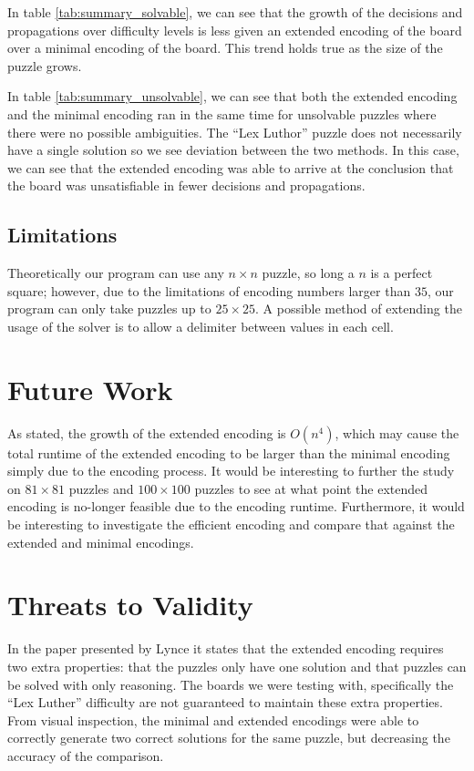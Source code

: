 \documentclass[conference,draftclsnofoot]{IEEEtran}
\begin{document}
In table \ref{tab:summary_solvable}, we can see that the growth of the
decisions and propagations over difficulty levels is less given an extended
encoding of the board over a minimal encoding of the board. This trend holds
true as the size of the puzzle grows.

In table \ref{tab:summary_unsolvable}, we can see that both the extended
encoding and the minimal encoding ran in the same time for unsolvable puzzles
where there were no possible ambiguities. The ``Lex Luthor'' puzzle does not
necessarily have a single solution so we see deviation between the two methods.
In this case, we can see that the extended encoding was able to arrive at the
conclusion that the board was unsatisfiable in fewer decisions and
propagations.

\subsection{Limitations}
Theoretically our program can use any $n \times n$ puzzle, so long a $n$ is a
perfect square; however, due to the limitations of encoding numbers
larger than $35$, our program can only take puzzles up to $25 \times 25$. A
possible method of extending the usage of the solver is to allow a delimiter
between values in each cell.

\section{Future Work}
As stated\cite{Kwon2005}, the growth of the extended encoding is $O(n^4)$,
which may cause the total runtime of the extended encoding to be larger than
the minimal encoding simply due to the encoding process. It would be
interesting to further the study on $81\times 81$ puzzles and $100 \times 100$
puzzles to see at what point the extended encoding is no-longer feasible due to
the encoding runtime. Furthermore, it would be interesting to investigate the
efficient encoding and compare that against the extended and minimal encodings.

\section{Threats to Validity}
In the paper presented by Lynce it states that the extended encoding
requires two extra properties: that the puzzles only have one solution and
that puzzles can be solved with only reasoning. The boards we were testing
with, specifically the ``Lex Luther'' difficulty are not guaranteed to maintain
these extra properties. From visual inspection, the minimal and extended
encodings were able to correctly generate two correct solutions for the same
puzzle, but decreasing the accuracy of the comparison.
\end{document}
